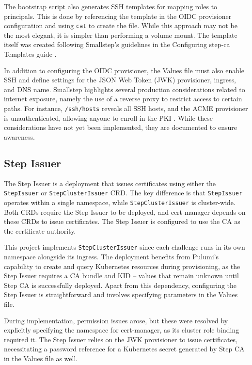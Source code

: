 The bootstrap script also generates SSH templates for mapping roles to principals. This is done by referencing the template in the OIDC provisioner configuration and using \texttt{cat} to create the file. While this approach may not be the most elegant, it is simpler than performing a volume mount. The template itself was created following Smallstep's guidelines in the Configuring step-ca Templates guide \parencite{smallstep_step_ca_templates}.

In addition to configuring the OIDC provisioner, the Values file must also enable SSH and define settings for the JSON Web Token (JWK) provisioner, ingress, and DNS name. Smallstep highlights several production considerations related to internet exposure, namely the use of a reverse proxy to restrict access to certain paths. For instance, \texttt{/ssh/hosts} reveals all SSH hosts, and the ACME provisioner is unauthenticated, allowing anyone to enroll in the PKI \parencite{SmallstepCA}. While these considerations have not yet been implemented, they are documented to ensure awareness.

\subsection{Step Issuer}
The Step Issuer is a deployment that issues certificates using either the \texttt{StepIssuer} or \texttt{StepClusterIssuer} CRD. The key difference is that \texttt{StepIssuer} operates within a single namespace, while \texttt{StepClusterIssuer} is cluster-wide. Both CRDs require the Step Issuer to be deployed, and cert-manager depends on these CRDs to issue certificates. The Step Issuer is configured to use the CA as the certificate authority.  

This project implements \texttt{StepClusterIssuer} since each challenge runs in its own namespace alongside its ingress. The deployment benefits from Pulumi's capability to create and query Kubernetes resources during provisioning, as the Step Issuer requires a CA bundle and KID -- values that remain unknown until Step CA is successfully deployed. Apart from this dependency, configuring the Step Issuer is straightforward and involves specifying parameters in the Values file.  

During implementation, permission issues arose, but these were resolved by explicitly specifying the namespace for cert-manager, as its cluster role binding required it. The Step Issuer relies on the JWK provisioner to issue certificates, necessitating a password reference for a Kubernetes secret generated by Step CA in the Values file as well.

